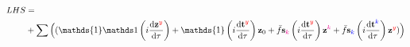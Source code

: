 \documentclass{article}
\newcommand{\bt}{\textbf{t}}
\newcommand{\bs}{\textbf{s}}
\newcommand{\bz}{\textbf{z}}
\begin{document}
%
%
%
%
%

\begin{align}\begin{split}
LHS &=
%
%
\\&+\sum\Big((\mathds{1}\mathds1\left(i\dv{\bz^{\red{y}}}{\tau}\right) + \mathds{1}\left(i\dv{\bt^{\blue{}\red{y}}}{\tau}\right)\bz_0 + \bar{f}\bs_{\magenta{}\blue{}\magenta{k}\red{}}\left(i\dv{\bt^{\blue{}\blue{}\red{y}}}{\tau}\right)\bz^{\magenta{k}\red{}} + \bar{f}\bs_{\magenta{}\blue{k}\magenta{}\red{}}\left(i\dv{\bt^{\blue{k}\blue{}\red{}}}{\tau}\right)\bz^{\magenta{}\red{y}})\Big)
\end{split}\end{align}
\end{document}
